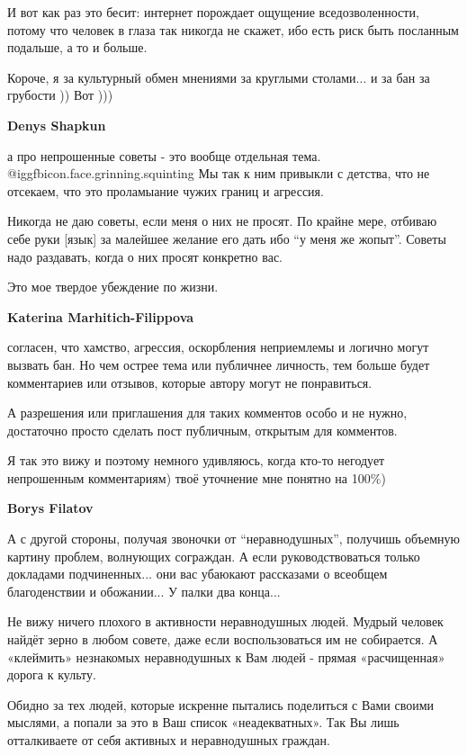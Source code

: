\begin{itemize}
\begin{itemize}
И вот как раз это бесит: интернет порождает ощущение вседозволенности, потому
что человек в глаза так никогда не скажет, ибо есть риск быть посланным
подальше, а то и больше.

Короче, я за культурный обмен мнениями за круглыми столами... и за бан за
грубости )) Вот )))

\textbf{Denys Shapkun} 

а про непрошенные советы - это вообще отдельная тема.  @igg{fbicon.face.grinning.squinting}  Мы так к ним привыкли
с детства, что не отсекаем, что это проламыание чужих границ и агрессия.

Никогда не даю советы, если меня о них не просят. По крайне мере, отбиваю себе
руки [язык] за малейшее желание его дать ибо \enquote{у меня же жопыт}. Советы надо
раздавать, когда о них просят конкретно вас.

Это мое твердое убеждение по жизни.

\textbf{Katerina Marhitich-Filippova} 

согласен, что хамство, агрессия, оскорбления неприемлемы и логично могут
вызвать бан. Но чем острее тема или публичнее личность, тем больше будет
комментариев или отзывов, которые автору могут не понравиться.

А разрешения или приглашения для таких комментов особо и не нужно, достаточно
просто сделать пост публичным, открытым для комментов.

Я так это вижу и поэтому немного удивляюсь, когда кто-то негодует непрошенным
комментариям) твоё уточнение мне понятно на 100\%)

\textbf{Borys Filatov} 

А с другой стороны, получая звоночки от \enquote{неравнодушных}, получишь объемную
картину проблем, волнующих сограждан. А если руководствоваться только докладами
подчиненных... они вас убаюкают рассказами о всеобщем благоденствии и
обожании... У палки два конца...

\end{itemize} %


Не вижу ничего плохого в активности неравнодушных людей. Мудрый человек найдёт
зерно в любом совете, даже если воспользоваться им не собирается. А «клеймить»
незнакомых неравнодушных к Вам людей - прямая «расчищенная» дорога к культу.

Обидно за тех людей, которые искренне пытались поделиться с Вами своими
мыслями, а попали за это в Ваш список «неадекватных». Так Вы лишь отталкиваете
от себя активных и неравнодушных граждан.


\end{itemize}
